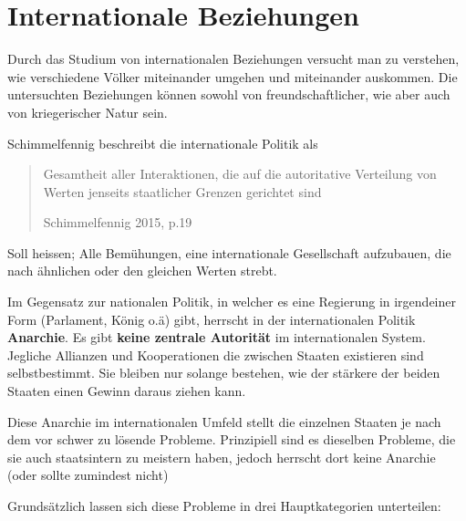 \documentclass[a4paper, 11pt]{article}
\begin{document}
\section{Internationale Beziehungen}

Durch das Studium von internationalen Beziehungen versucht man zu verstehen, wie verschiedene Völker miteinander umgehen und miteinander auskommen. Die untersuchten Beziehungen können sowohl von freundschaftlicher, wie aber auch von kriegerischer Natur sein.

\vspace{10px}

Schimmelfennig beschreibt die internationale Politik als \blockquote[Schimmelfennig 2015, p.19]{Gesamtheit aller Interaktionen, die auf die autoritative Verteilung von Werten jenseits staatlicher Grenzen gerichtet sind}. Soll heissen; Alle Bemühungen, eine internationale Gesellschaft aufzubauen, die nach ähnlichen oder den gleichen Werten strebt.

\vspace{10px}

Im Gegensatz zur nationalen Politik, in welcher es eine Regierung in irgendeiner Form (Parlament, König o.ä) gibt, herrscht in der internationalen Politik \textbf{Anarchie}. Es gibt \textbf{keine zentrale Autorität} im internationalen System. Jegliche Allianzen und Kooperationen die zwischen Staaten existieren sind selbstbestimmt. Sie bleiben nur solange bestehen, wie der stärkere der beiden Staaten einen Gewinn daraus ziehen kann.

Diese Anarchie im internationalen Umfeld stellt die einzelnen Staaten je nach dem vor schwer zu lösende Probleme. Prinzipiell sind es dieselben Probleme, die sie auch staatsintern zu meistern haben, jedoch herrscht dort keine Anarchie (oder sollte zumindest nicht)

Grundsätzlich lassen sich diese Probleme in drei Hauptkategorien unterteilen:
\end{document}
